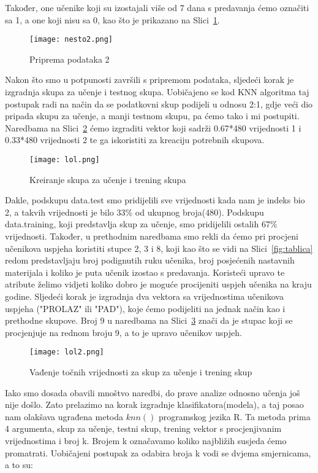 \documentclass[times, utf8, zavrsni, numeric]{fer}
\begin{document}
Također, one učenike koji su izostajali više od 7 dana s predavanja ćemo označiti sa 1, a one koji nisu sa 0, kao što je prikazano na Slici~\ref{fig:nesto2}.
\begin{figure}[H]
\centering
\texttt{[image: nesto2.png]}
\caption{Priprema podataka 2}
\label{fig:nesto2}
\end{figure}
Nakon što smo u potpunosti završili s pripremom podataka, sljedeći korak je izgradnja skupa za učenje i testnog skupa. Uobičajeno se kod KNN algoritma taj postupak radi na način da se podatkovni skup podijeli u odnosu 2:1, gdje veći dio pripada skupu za učenje, a manji testnom skupu, pa ćemo tako i mi postupiti.
Naredbama na Slici~\ref{fig:lol} ćemo izgraditi vektor koji sadrži 0.67*480 vrijednosti 1 i 0.33*480 vrijednosti 2 te ga iskoristiti za kreaciju potrebnih skupova. 
\begin{figure}[H]
\centering
\texttt{[image: lol.png]}
\caption{Kreiranje skupa za učenje i trening skupa}
\label{fig:lol}
\end{figure}
Dakle, podskupu data.test smo pridijelili sve vrijednosti kada nam je indeks bio 2, a takvih vrijednosti je bilo 33\% od ukupnog broja(480).  Podskupu data.training, koji predstavlja skup za učenje, smo pridijelili ostalih 67\% vrijednosti. Također, u prethodnim naredbama smo rekli da ćemo pri procjeni učenikova uspjeha koristiti stupce 2, 3 i 8, koji kao što se vidi na Slici~\ref{fig:tablica} redom predstavljaju broj podignutih ruku učenika, broj posjećenih nastavnih materijala i koliko je puta učenik izostao s predavanja. Koristeći upravo te atribute želimo vidjeti koliko dobro je moguće procijeniti uspjeh učenika na kraju godine. Sljedeći korak je izgradnja dva vektora sa vrijednostima učenikova uspjeha ("PROLAZ" ili "PAD"), koje ćemo podijeliti na jednak način kao i prethodne skupove. Broj 9 u naredbama na Slici~\ref{fig:lol2} znači da je stupac koji se procjenjuje na rednom broju 9, a to je upravo učenikov uspjeh.
\begin{figure}[H]
\centering
\texttt{[image: lol2.png]}
\caption{Vađenje točnih vrijednosti za skup za učenje i trening skup}
\label{fig:lol2}
\end{figure}
Iako smo dosada obavili mnoštvo naredbi, do prave analize odnosno učenja još nije došlo. Zato prelazimo na korak izgradnje klasifikatora(modela), a taj posao nam olakšava ugrađena metoda $knn()$ programskog jezika R. Ta metoda prima 4 argumenta, skup za učenje, testni skup, trening vektor s procjenjivanim vrijednostima i broj k. Brojem k označavamo koliko najbližih susjeda ćemo promatrati. Uobičajeni postupak za odabira broja k vodi se dvjema smjernicama, a to su:
\end{document}
